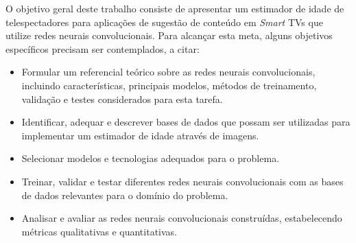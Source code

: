 O objetivo geral deste trabalho consiste de apresentar um estimador de idade de telespectadores para aplicações de sugestão de conteúdo em \emph{Smart} TVs que utilize redes neurais convolucionais. Para alcançar esta meta, alguns objetivos específicos precisam ser contemplados, a citar:

\begin{itemize}
     \item Formular um referencial teórico sobre as redes neurais convolucionais, incluindo características, principais modelos, métodos de treinamento, validação e testes considerados para esta tarefa.
     \item Identificar, adequar e descrever bases de dados que possam ser utilizadas para implementar um estimador de idade através de imagens.
     \item Selecionar modelos e tecnologias adequados para o problema.
     \item Treinar, validar e testar diferentes redes neurais convolucionais com as bases de dados relevantes para o domínio do problema.
     \item Analisar e avaliar as redes neurais convolucionais construídas, estabelecendo métricas qualitativas e quantitativas.
\end{itemize}
